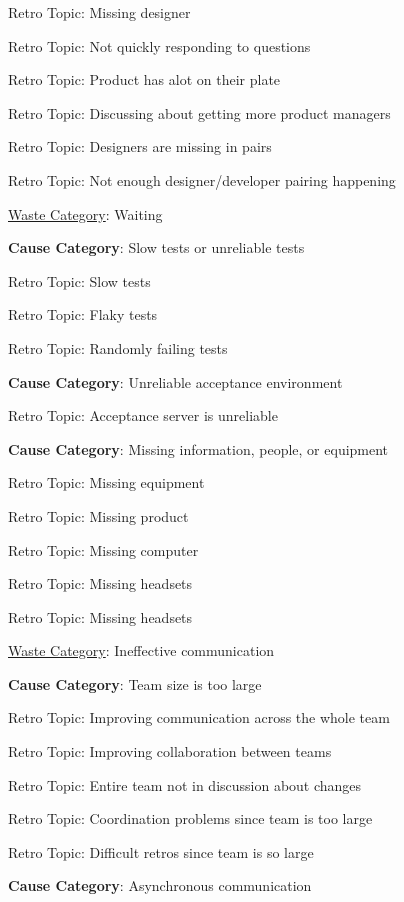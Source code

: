 \quad \quad \quad Retro Topic: Missing designer

\quad \quad \quad Retro Topic: Not quickly responding to questions

\quad \quad \quad Retro Topic: Product has alot on their plate

\quad \quad \quad Retro Topic: Discussing about getting more product managers

\quad \quad \quad Retro Topic: Designers are missing in pairs

\quad \quad \quad Retro Topic: Not enough designer/developer pairing happening



\underline{Waste Category}: Waiting

\quad \textbf{Cause Category}: Slow tests or unreliable tests

\quad \quad Retro Topic: Slow tests

\quad \quad Retro Topic: Flaky tests

\quad \quad Retro Topic: Randomly failing tests

\quad \textbf{Cause Category}: Unreliable acceptance environment

\quad \quad Retro Topic: Acceptance server is unreliable

\quad \textbf{Cause Category}: Missing information, people, or equipment

\quad \quad Retro Topic: Missing equipment

\quad \quad Retro Topic: Missing product

\quad \quad Retro Topic: Missing computer

\quad \quad Retro Topic: Missing headsets

\quad \quad Retro Topic: Missing headsets

\underline{Waste Category}: Ineffective communication

\quad \textbf{Cause Category}: Team size is too large

\quad \quad Retro Topic: Improving communication across the whole team

\quad \quad Retro Topic: Improving collaboration between teams

\quad \quad Retro Topic: Entire team not in discussion about changes

\quad \quad Retro Topic: Coordination problems since team is too large

\quad \quad Retro Topic: Difficult retros since team is so large

\quad \textbf{Cause Category}: Asynchronous communication


